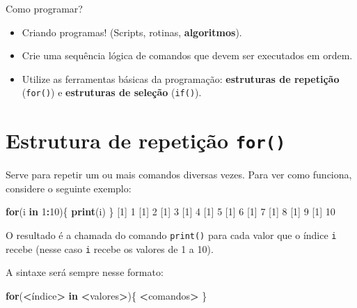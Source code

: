 \documentclass[10pt,a4paper]{book}
\newenvironment{Shaded}{\begin{snugshade}}{\end{snugshade}}
\newcommand{\KeywordTok}[1]{\textcolor[rgb]{0.13,0.29,0.53}{\textbf{#1}}}
\newcommand{\DecValTok}[1]{\textcolor[rgb]{0.00,0.00,0.81}{#1}}
\newcommand{\StringTok}[1]{\textcolor[rgb]{0.31,0.60,0.02}{#1}}
\newcommand{\ControlFlowTok}[1]{\textcolor[rgb]{0.13,0.29,0.53}{\textbf{#1}}}
\newcommand{\OperatorTok}[1]{\textcolor[rgb]{0.81,0.36,0.00}{\textbf{#1}}}
\newcommand{\NormalTok}[1]{#1}
\providecommand{\tightlist}{%
  \setlength{\itemsep}{0pt}\setlength{\parskip}{0pt}}
\begin{document}
Como programar?

\begin{itemize}
\tightlist
\item
  Criando programas! (Scripts, rotinas, \textbf{algoritmos}).
\item
  Crie uma sequência lógica de comandos que devem ser executados em
  ordem.
\item
  Utilize as ferramentas básicas da programação: \textbf{estruturas de
  repetição} (\texttt{for()}) e \textbf{estruturas de seleção}
  (\texttt{if()}).
\end{itemize}

\section{\texorpdfstring{Estrutura de repetição
\texttt{for()}}{Estrutura de repetição for()}}\label{estrutura-de-repeticao-for}

Serve para repetir um ou mais comandos diversas vezes. Para ver como
funciona, considere o seguinte exemplo:

\begin{Shaded}
\begin{Highlighting}[]
\ControlFlowTok{for}\NormalTok{(i }\ControlFlowTok{in} \DecValTok{1}\OperatorTok{:}\DecValTok{10}\NormalTok{)\{}
    \KeywordTok{print}\NormalTok{(i)}
\NormalTok{\}}
\NormalTok{[}\DecValTok{1}\NormalTok{] }\DecValTok{1}
\NormalTok{[}\DecValTok{1}\NormalTok{] }\DecValTok{2}
\NormalTok{[}\DecValTok{1}\NormalTok{] }\DecValTok{3}
\NormalTok{[}\DecValTok{1}\NormalTok{] }\DecValTok{4}
\NormalTok{[}\DecValTok{1}\NormalTok{] }\DecValTok{5}
\NormalTok{[}\DecValTok{1}\NormalTok{] }\DecValTok{6}
\NormalTok{[}\DecValTok{1}\NormalTok{] }\DecValTok{7}
\NormalTok{[}\DecValTok{1}\NormalTok{] }\DecValTok{8}
\NormalTok{[}\DecValTok{1}\NormalTok{] }\DecValTok{9}
\NormalTok{[}\DecValTok{1}\NormalTok{] }\DecValTok{10}
\end{Highlighting}
\end{Shaded}

O resultado é a chamada do comando \texttt{print()} para cada valor que
o índice \texttt{i} recebe (nesse caso \texttt{i} recebe os valores de 1
a 10).

A sintaxe será sempre nesse formato:

\begin{Shaded}
\begin{Highlighting}[]
\ControlFlowTok{for}\NormalTok{(}\OperatorTok{<}\NormalTok{índice}\OperatorTok{>}\StringTok{ }\ControlFlowTok{in} \OperatorTok{<}\NormalTok{valores}\OperatorTok{>}\NormalTok{)\{}
    \OperatorTok{<}\NormalTok{comandos}\OperatorTok{>}
\NormalTok{\}}
\end{Highlighting}
\end{Shaded}
\end{document}
